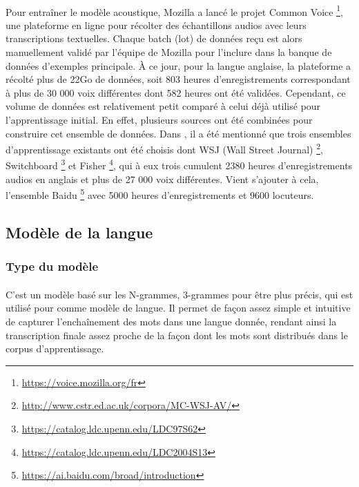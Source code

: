 		\paragraph{}
		Pour entraîner le modèle acoustique, Mozilla a lancé le projet Common Voice \footnote{\url{https://voice.mozilla.org/fr}}, une plateforme en ligne pour récolter des échantillons audios avec leurs transcriptions textuelles. Chaque batch (lot) de données reçu est alors manuellement validé par l'équipe de Mozilla pour l'inclure dans la banque de données d'exemples principale. À ce jour, pour la langue anglaise, la plateforme a récolté plus de 22Go de données, soit 803 heures d'enregistrements correspondant à plus de 30 000 voix différentes dont 582 heures ont été validées. Cependant, ce volume de données est relativement petit comparé à celui déjà utilisé pour l'apprentissage initial. En effet, plusieurs sources ont été combinées pour construire cet ensemble de données. Dans \citep{deepspeech_paper}, il a été mentionné que trois ensembles d'apprentissage existants ont été choisis dont WSJ (Wall Street Journal) \footnote{\url{http://www.cstr.ed.ac.uk/corpora/MC-WSJ-AV/}}, Switchboard \footnote{\url{https://catalog.ldc.upenn.edu/LDC97S62}} et Fisher \footnote{\url{https://catalog.ldc.upenn.edu/LDC2004S13}}, qui à eux trois cumulent 2380 heures d'enregistrements audios en anglais et plus de 27 000 voix différentes. Vient s'ajouter à cela, l'ensemble Baidu \footnote{\url{https://ai.baidu.com/broad/introduction}} avec 5000 heures d'enregistrements et 9600 locuteurs.
		
	\subsection{Modèle de la langue}
		\subsubsection*{Type du modèle}
		\paragraph{}
		
		C'est un modèle basé sur les N-grammes, 3-grammes pour être plus précis, qui est utilisé pour comme modèle de langue. Il permet de façon assez simple et intuitive de capturer l'enchaînement des mots dans une langue donnée, rendant ainsi la transcription finale assez proche de la façon dont les mots sont distribués dans le corpus d'apprentissage.
		
